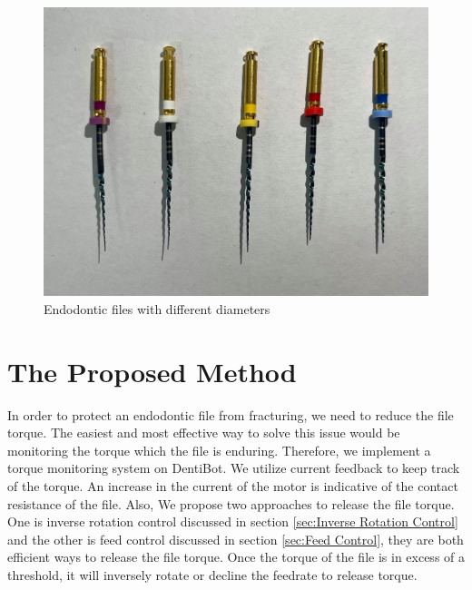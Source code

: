 \begin{figure}[htbp]
\begin{center}
\includegraphics[width=0.7\linewidth]{Images/files.jpg}
\caption{Endodontic files with different diameters
}\label{fig: files}
\end{center}
\end{figure}	
\section{The Proposed Method}
\hspace*{6mm}In order to protect an endodontic file from fracturing, we need to reduce the file torque. The easiest and most effective way to solve this issue would be monitoring the torque which the file is enduring. Therefore, we implement a torque monitoring system on DentiBot. We utilize current feedback to keep track of the torque. An increase in the current of the motor is indicative of the contact resistance of the file. Also, We propose two approaches to release the file torque. One is inverse rotation control discussed in section \ref{sec:Inverse Rotation Control} and the other is feed control discussed in section \ref{sec:Feed Control}, they are both efficient ways to release the file torque. Once the torque of the file is in excess of a threshold, it will inversely rotate or decline the feedrate to release torque. 
